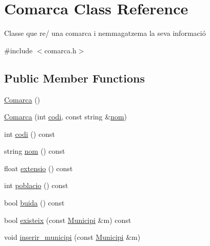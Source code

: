 \hypertarget{classComarca}{}\section{Comarca Class Reference}
\label{classComarca}


Classe que re/  una comarca i n\textquotesingle{}emmagatzema la seva informació  




{\ttfamily \#include $<$comarca.\+h$>$}

\subsection*{Public Member Functions}
\begin{DoxyCompactItemize}
\item 
\hyperlink{classComarca_a2c9c27819363b301ecb2fba47f198ee6}{Comarca} ()
\item 
\hyperlink{classComarca_ae73301123c5aa51eeb1b763a7a616e7e}{Comarca} (int \hyperlink{classComarca_a53b5d556f592bb3fe49d97a907eb7eae}{codi}, const string \&\hyperlink{classComarca_aacbbe9a77b5a81d8fd86c06e815e5edc}{nom})
\item 
int \hyperlink{classComarca_a53b5d556f592bb3fe49d97a907eb7eae}{codi} () const
\item 
string \hyperlink{classComarca_aacbbe9a77b5a81d8fd86c06e815e5edc}{nom} () const
\item 
float \hyperlink{classComarca_a311187319875b89b31a8ea4271fca03a}{extensio} () const
\item 
int \hyperlink{classComarca_affecc6c07ec0600d6e3e62b23e564222}{poblacio} () const
\item 
bool \hyperlink{classComarca_a5085cd7eeb31a30011e40ca726beb5c9}{buida} () const
\item 
bool \hyperlink{classComarca_a1cc6e6f47984d1a9d611b665a0742899}{existeix} (const \hyperlink{classMunicipi}{Municipi} \&m) const
\item 
void \hyperlink{classComarca_a625e401c9a331b1860bf2a95495e29b5}{inserir\+\_\+municipi} (const \hyperlink{classMunicipi}{Municipi} \&m)
\end{DoxyCompactItemize}
